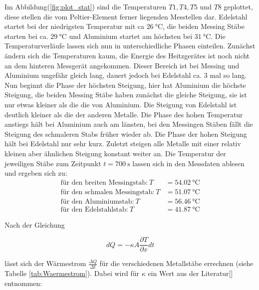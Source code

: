       \noindent Im Abbildung(\ref{fig:plot_stat}) sind die Temperaturen $T1, T4, T5$ und $T8$ geplottet, diese stellen die vom Peltier-Element ferner 
      liegenden Messtellen dar. Edelstahl startet bei der niedrigsten Temperatur mit ca $\SI{26}{\celsius}$, die beiden Messing Stäbe starten 
      bei ca. $\SI{29}{\celsius}$ und Aluminium startet am höchsten bei $\SI{31}{\celsius}$. Die Temperaturverläufe 
      lassen sich nun in unterschiedliche Phasen einteilen. Zunächst ändern sich die Temperaturen kaum, die Energie des 
      Heitzgerätes ist noch nicht an dem hinteren Messgerät angekommen. Dieser Bereich ist bei Messing und 
      Aluminium ungefähr gleich lang, dauert jedoch bei Edelstahl ca. 3 mal so lang. Nun beginnt die Phase der 
      höchsten Steigung, hier hat Aluminium die höchste Steigung, die beiden Messing Stäbe haben zunächst die 
      gleiche Steigung, sie ist nur etwas kleiner als die die von Aluminium. Die Steigung von Edelstahl ist 
      deutlich kleiner als die der anderen Metalle. Die Phase des hohen Temperatur anstiegs hält bei Aluminium auch am länsten,
      bei den Messingen Stäben fällt die Steigung des schmaleren Stabs früher wieder ab. Die Phase der hohen Steigung 
      hält bei Edelstahl nur sehr kurz. Zuletzt steigen alle Metalle mit einer relativ kleinen aber ähnlichen Steigung konstant 
      weiter an.
      Die Temperatur der jeweiligen Stäbe zum Zeitpunkt $t=\SI{700}{\second}$ lassen sich in den Messdaten ablesen und ergeben sich zu:
      \begin{align}
        \text{für den breiten Messingstab:} \: T&= \SI{54.02}{\celsius}\\ \label{eqn:M1}
        \text{für den schmalen Messingstab:} \: T&= \SI{51.07}{\celsius}\\ 
        \text{für den Aluminiumstab:} \: T&= \SI{56.46}{\celsius}\\ 
        \text{für den Edelstahlstab:} \: T&= \SI{41.87}{\celsius} \label{eqn:E1}
      \end{align}
    
      \noindent Nach der Gleichung  
      
      \begin{equation}\label{eqn:Wärmemenge}
        dQ = -\kappa A \frac{\partial T}{\partial x}dt 
      \end{equation}
      
      \noindent lässt sich der Wärmestrom $\frac{\Delta Q}{\Delta t}$ für die verschiedenen Metallstäbe 
      errechnen (siehe Tabelle \ref{tab:Waermestrom}).
      Dabei wird für $\kappa $ ein Wert aus der Literatur[\cite{leit}] entnommen:

